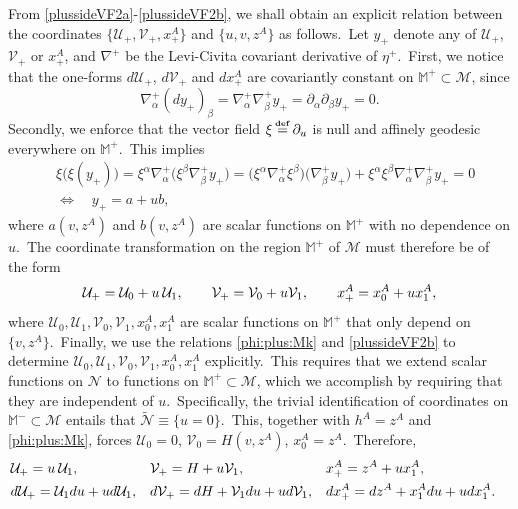 \documentclass[11pt]{article}
\numberwithin{equation}{section}
\def\Mkp{\mathbb{M}^+}
\def\Mkm{\mathbb{M}^-}
\def\flatp{\eta^+}
\def\defi{{\stackrel{\mbox{\tiny {\textbf{def}}}}{\,\, = \,\, }}}
\newcommand{\nn}{\nonumber}
\newcommand\N{\mathcal N}
\newcommand\M{\mathcal M}
\def\defi{{\stackrel{\mbox{\tiny \textup{\textbf{def}}}}{\,\, = \,\, }}}
\newcommand{\cp}{\partial}
\newcommand{\lp}{\left(}
\newcommand{\rp}{\right)}
\newcommand{\cu}{\mathcal{U}}
\newcommand{\cv}{\mathcal{V}}
\newcommand{\nullhyp}{\widetilde{\N}}
\begin{document}
From \eqref{plussideVF2a}-\eqref{plussideVF2b}, we shall  
obtain an explicit relation between the coordinates $\{\cu_+,\cv_+,x_+^A\}$ and $\{u,v,z^A\}$ as follows.\  
Let $y_+$ denote any of $\cu_+$, $\cv_+$ or $x_+^A$, and $\nabla^+$ be the Levi-Civita covariant derivative of $\flatp$.\ First, we notice that 
the one-forms $d\cu_+$, $d\cv_+$ and $dx^A_+$ are covariantly constant on $\Mkp\subset\M$, since   
\begin{equation}
\nabla^+_{\alpha}(dy_+)_{\beta}=\nabla^+_{\alpha}\nabla^+_{\beta}y_+=\cp_{\alpha}\cp_{\beta}y_+=0.
\end{equation}
Secondly, we enforce that the vector field $\xi\defi \cp_u$ is null and affinely geodesic everywhere on $\Mkp$.\ This implies 
\begin{align}
\nn &\xi\big(\xi(y_+)\big)= \xi^{\alpha}\nabla^+_{\alpha}\big(  \xi^{\beta}\nabla^+_{\beta}y_+\big)=\big( \xi^{\alpha}\nabla^+_{\alpha} \xi^{\beta}\big)\big( \nabla^+_{\beta}y_+\big)+ \xi^{\alpha} \xi^{\beta}\nabla^+_{\alpha} \nabla^+_{\beta}y_+=0\\
\label{second:Der:coords}&\Longleftrightarrow\quad y_+=a+ub,
\end{align}
where $a\lp v,z^A\rp$ and $b\lp v,z^A\rp$ are scalar functions on 
$\Mkp$ with no dependence on $u$.\ The coordinate transformation on the region $\Mkp$ of $\M$ must therefore be of the form 
\begin{equation}
\label{coord:transf:general}\cu_+=\cu_0+u\hspace{0.075cm}\cu_1,\qquad\cv_+=\cv_0+u\cv_1,\qquad x^A_+=x^A_0+u x^A_1,
\end{equation}
where $\cu_0,\cu_1,\cv_0,\cv_1,x^A_0,x^A_1$ are scalar functions on $\Mkp$ that only depend on $\{v,z^A\}$.\ 
Finally, we use the relations \eqref{phi:plus:Mk} and \eqref{plussideVF2b} to determine $\cu_0,\cu_1,\cv_0,\cv_1,x^A_0,x^A_1$ explicitly.\ This requires that we extend scalar functions on $\N$ to functions on $\Mkp\subset\M$, which we accomplish by requiring that they are independent of $u$.\ 
Specifically, the trivial identification of coordinates on $\Mkm\subset\M$ entails that $\nullhyp\equiv\{u=0\}$.\ This, together with $h^A=z^A$ and \eqref{phi:plus:Mk}, forces $\cu_0=0$, $\cv_0=H\lp v,z^A\rp$, $x^A_0=z^A$.\ Therefore, 
\begin{align}
\label{eq1a:0}&\cu_+=u\hspace{0.075cm}\cu_1,&&\cv_+=H+u\cv_1,&& x^A_+=z^A+u x^A_1,&\\
\label{eq1a} &d\cu_+=\cu_1du+ud\cu_1,&&d\cv_+=dH+\cv_1du+ud\cv_1,&& dx^A_+=dz^A+ x^A_1du+u dx^A_1.&
\end{align}
\end{document}
